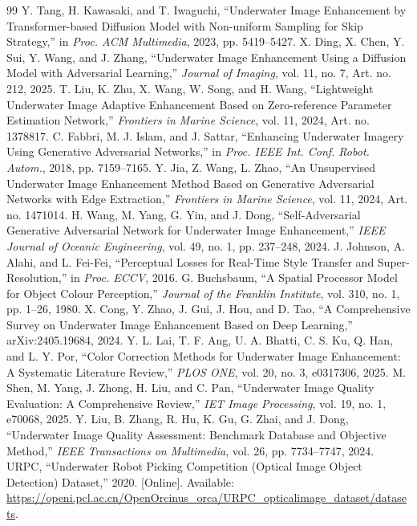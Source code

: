 \documentclass[final,1p,times]{elsarticle}
\begin{document}
\begin{thebibliography}{99}
 Y. Tang, H. Kawasaki, and T. Iwaguchi, ``Underwater Image Enhancement by Transformer-based Diffusion Model with Non-uniform Sampling for Skip Strategy,'' in \emph{Proc. ACM Multimedia}, 2023, pp. 5419--5427.
 X. Ding, X. Chen, Y. Sui, Y. Wang, and J. Zhang, ``Underwater Image Enhancement Using a Diffusion Model with Adversarial Learning,'' \emph{Journal of Imaging}, vol. 11, no. 7, Art. no. 212, 2025.
 T. Liu, K. Zhu, X. Wang, W. Song, and H. Wang, ``Lightweight Underwater Image Adaptive Enhancement Based on Zero-reference Parameter Estimation Network,'' \emph{Frontiers in Marine Science}, vol. 11, 2024, Art. no. 1378817.
 C. Fabbri, M. J. Islam, and J. Sattar, ``Enhancing Underwater Imagery Using Generative Adversarial Networks,'' in \emph{Proc. IEEE Int. Conf. Robot. Autom.}, 2018, pp. 7159--7165.
 Y. Jia, Z. Wang, L. Zhao, ``An Unsupervised Underwater Image Enhancement Method Based on Generative Adversarial Networks with Edge Extraction,'' \emph{Frontiers in Marine Science}, vol. 11, 2024, Art. no. 1471014.
 H. Wang, M. Yang, G. Yin, and J. Dong, ``Self-Adversarial Generative Adversarial Network for Underwater Image Enhancement,'' \emph{IEEE Journal of Oceanic Engineering}, vol. 49, no. 1, pp. 237--248, 2024.
 J. Johnson, A. Alahi, and L. Fei-Fei, ``Perceptual Losses for Real-Time Style Transfer and Super-Resolution,'' in \emph{Proc. ECCV}, 2016.
 G. Buchsbaum, ``A Spatial Processor Model for Object Colour Perception,'' \emph{Journal of the Franklin Institute}, vol. 310, no. 1, pp. 1--26, 1980.
 X. Cong, Y. Zhao, J. Gui, J. Hou, and D. Tao, ``A Comprehensive Survey on Underwater Image Enhancement Based on Deep Learning,'' arXiv:2405.19684, 2024.
 Y. L. Lai, T. F. Ang, U. A. Bhatti, C. S. Ku, Q. Han, and L. Y. Por, ``Color Correction Methods for Underwater Image Enhancement: A Systematic Literature Review,'' \emph{PLOS ONE}, vol. 20, no. 3, e0317306, 2025.
 M. Shen, M. Yang, J. Zhong, H. Liu, and C. Pan, ``Underwater Image Quality Evaluation: A Comprehensive Review,'' \emph{IET Image Processing}, vol. 19, no. 1, e70068, 2025.
 Y. Liu, B. Zhang, R. Hu, K. Gu, G. Zhai, and J. Dong, ``Underwater Image Quality Assessment: Benchmark Database and Objective Method,'' \emph{IEEE Transactions on Multimedia}, vol. 26, pp. 7734--7747, 2024.
 URPC, ``Underwater Robot Picking Competition (Optical Image Object Detection) Dataset,'' 2020. [Online]. Available: \url{https://openi.pcl.ac.cn/OpenOrcinus_orca/URPC_opticalimage_dataset/datasets}.

\end{thebibliography}
\end{document}
